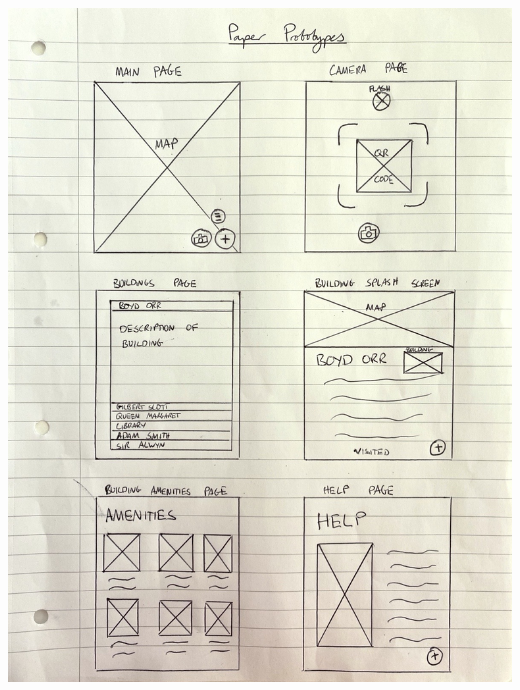 \documentclass[a4,10pt,twocolumn]{article}
\begin{document}
\noindent\includegraphics[width=\columnwidth]{paperPrototype2.jpeg}
\end{document}
